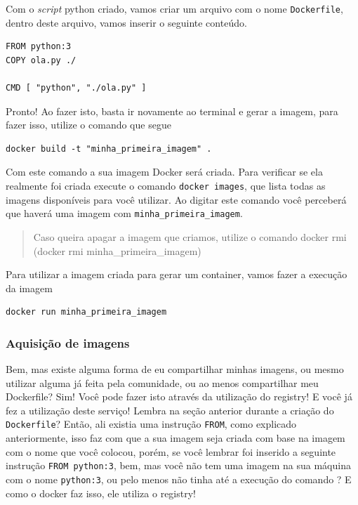 \documentclass[]{article}
\begin{document}
Com o \emph{script} python criado, vamos criar um arquivo com o nome \texttt{Dockerfile}, dentro deste arquivo, vamos inserir o seguinte conteúdo.

\begin{verbatim}
FROM python:3
COPY ola.py ./

CMD [ "python", "./ola.py" ]
\end{verbatim}

Pronto! Ao fazer isto, basta ir novamente ao terminal e gerar a imagem, para fazer isso, utilize o comando que segue

\begin{verbatim}
docker build -t "minha_primeira_imagem" .
\end{verbatim}

Com este comando a sua imagem Docker será criada. Para verificar se ela realmente foi criada execute o comando \texttt{docker\ images}, que lista todas as imagens disponíveis para você utilizar. Ao digitar este comando você perceberá que haverá uma imagem com \texttt{minha\_primeira\_imagem}.

\begin{quote}
Caso queira apagar a imagem que criamos, utilize o comando docker rmi (docker rmi minha\_primeira\_imagem)
\end{quote}

Para utilizar a imagem criada para gerar um container, vamos fazer a execução da imagem

\begin{verbatim}
docker run minha_primeira_imagem
\end{verbatim}

\hypertarget{aquisicao-de-imagens}{%
\subsubsection{Aquisição de imagens}\label{aquisicao-de-imagens}}

Bem, mas existe alguma forma de eu compartilhar minhas imagens, ou mesmo utilizar alguma já feita pela comunidade, ou ao menos compartilhar meu Dockerfile? Sim! Você pode fazer isto através da utilização do registry! E você já fez a utilização deste serviço! Lembra na seção anterior durante a criação do \texttt{Dockerfile}? Então, ali existia uma instrução \texttt{FROM}, como explicado anteriormente, isso faz com que a sua imagem seja criada com base na imagem com o nome que você colocou, porém, se você lembrar foi inserido a seguinte instrução \texttt{FROM\ python:3}, bem, mas você não tem uma imagem na sua máquina com o nome \texttt{python:3}, ou pelo menos não tinha até a execução do comando ? E como o docker faz isso, ele utiliza o registry!
\end{document}
